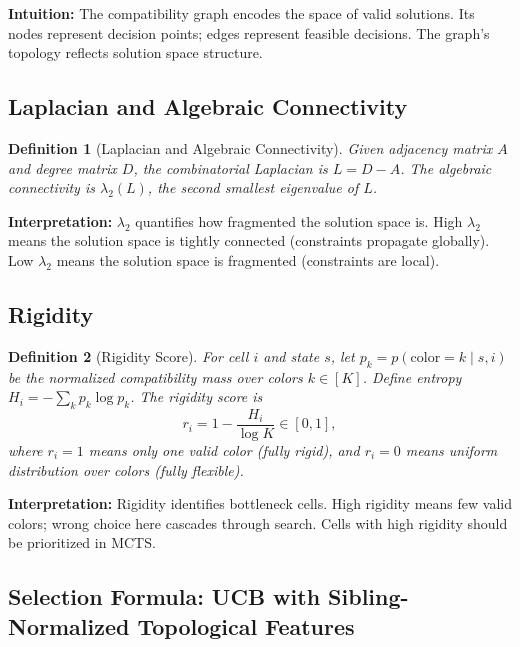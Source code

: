 \documentclass[11pt]{article}
\newtheorem{definition}{Definition}
\begin{document}
\textbf{Intuition:} The compatibility graph encodes the space of valid solutions. Its nodes represent decision points; edges represent feasible decisions. The graph's topology reflects solution space structure.

\subsection{Laplacian and Algebraic Connectivity}

\begin{definition}[Laplacian and Algebraic Connectivity]
Given adjacency matrix $A$ and degree matrix $D$, the combinatorial Laplacian is $L = D - A$. The algebraic connectivity is $\lambda_2(L)$, the second smallest eigenvalue of $L$.
\end{definition}

\textbf{Interpretation:} $\lambda_2$ quantifies how fragmented the solution space is. High $\lambda_2$ means the solution space is tightly connected (constraints propagate globally). Low $\lambda_2$ means the solution space is fragmented (constraints are local).

\subsection{Rigidity}

\begin{definition}[Rigidity Score]
For cell $i$ and state $s$, let $p_k = p(\text{color} = k \mid s, i)$ be the normalized compatibility mass over colors $k \in [K]$. Define entropy $H_i = -\sum_k p_k \log p_k$. The rigidity score is
\begin{equation}
r_i = 1 - \frac{H_i}{\log K} \in [0, 1],
\end{equation}
where $r_i = 1$ means only one valid color (fully rigid), and $r_i = 0$ means uniform distribution over colors (fully flexible).
\end{definition}

\textbf{Interpretation:} Rigidity identifies bottleneck cells. High rigidity means few valid colors; wrong choice here cascades through search. Cells with high rigidity should be prioritized in MCTS.

\subsection{Selection Formula: UCB with Sibling-Normalized Topological Features}

\label{sec:selection-formula}
\end{document}
